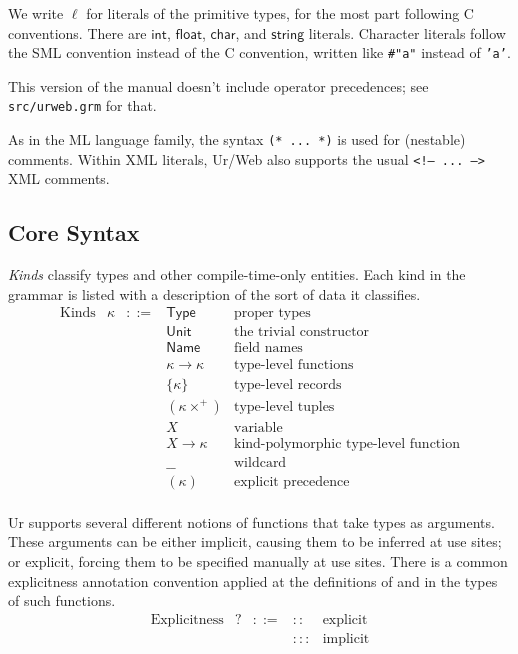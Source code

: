 \documentclass{article}
\newcommand{\mt}[1]{\mathsf{#1}}
\begin{document}
We write $\ell$ for literals of the primitive types, for the most part following C conventions.  There are $\mt{int}$, $\mt{float}$, $\mt{char}$, and $\mt{string}$ literals.  Character literals follow the SML convention instead of the C convention, written like \texttt{\#"a"} instead of \texttt{'a'}.

This version of the manual doesn't include operator precedences; see \texttt{src/urweb.grm} for that.

As in the ML language family, the syntax \texttt{(* ... *)} is used for (nestable) comments.  Within XML literals, Ur/Web also supports the usual \texttt{<!-- ... -->} XML comments.

\subsection{\label{core}Core Syntax}

\emph{Kinds} classify types and other compile-time-only entities.  Each kind in the grammar is listed with a description of the sort of data it classifies.
$$\begin{array}{rrcll}
  \textrm{Kinds} & \kappa &::=& \mt{Type} & \textrm{proper types} \\
  &&& \mt{Unit} & \textrm{the trivial constructor} \\
  &&& \mt{Name} & \textrm{field names} \\
  &&& \kappa \to \kappa & \textrm{type-level functions} \\
  &&& \{\kappa\} & \textrm{type-level records} \\
  &&& (\kappa\times^+) & \textrm{type-level tuples} \\
  &&& X & \textrm{variable} \\
  &&& X \longrightarrow \kappa & \textrm{kind-polymorphic type-level function} \\
  &&& \_\_ & \textrm{wildcard} \\
  &&& (\kappa) & \textrm{explicit precedence} \\
\end{array}$$

Ur supports several different notions of functions that take types as arguments.  These arguments can be either implicit, causing them to be inferred at use sites; or explicit, forcing them to be specified manually at use sites.  There is a common explicitness annotation convention applied at the definitions of and in the types of such functions.
$$\begin{array}{rrcll}
  \textrm{Explicitness} & ? &::=& :: & \textrm{explicit} \\
  &&& ::: & \textrm{implicit}
\end{array}$$
\end{document}

